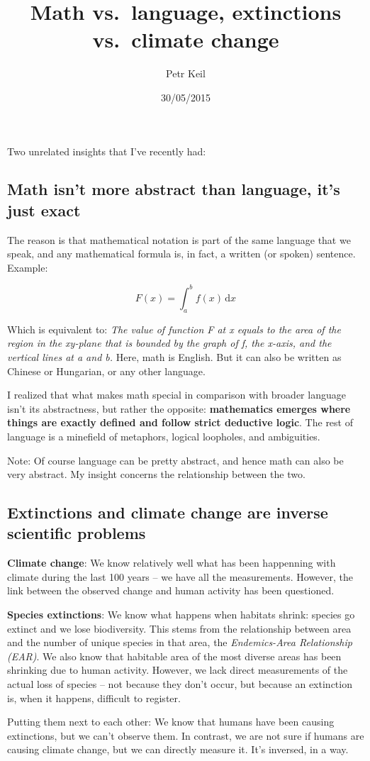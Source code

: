 \documentclass[]{article}
\title{Math vs.~language, extinctions vs.~climate change}
\author{Petr Keil}
\date{30/05/2015}
\begin{document}
\maketitle


Two unrelated insights that I've recently had:

\subsection{Math isn't more abstract than language, it's just
exact}\label{math-isnt-more-abstract-than-language-its-just-exact}

The reason is that mathematical notation is part of the same language
that we speak, and any mathematical formula is, in fact, a written (or
spoken) sentence. Example:

\[F(x)=\int_a^b \! f(x) \, \mathrm{d}x\]

Which is equivalent to: \emph{The value of function F at x equals to the
area of the region in the xy-plane that is bounded by the graph of f,
the x-axis, and the vertical lines at a and b.} Here, math is English.
But it can also be written as Chinese or Hungarian, or any other
language.

I realized that what makes math special in comparison with broader
language isn't its abstractness, but rather the opposite:
\textbf{mathematics emerges where things are exactly defined and follow
strict deductive logic}. The rest of language is a minefield of
metaphors, logical loopholes, and ambiguities.

Note: Of course language can be pretty abstract, and hence math can also
be very abstract. My insight concerns the relationship between the two.

\subsection{Extinctions and climate change are inverse scientific
problems}\label{extinctions-and-climate-change-are-inverse-scientific-problems}

\textbf{Climate change}: We know relatively well what has been
happenning with climate during the last 100 years -- we have all the
measurements. However, the link between the observed change and human
activity has been questioned.

\textbf{Species extinctions}: We know what happens when habitats shrink:
species go extinct and we lose biodiversity. This stems from the
relationship between area and the number of unique species in that area,
the \emph{Endemics-Area Relationship (EAR)}. We also know that habitable
area of the most diverse areas has been shrinking due to human activity.
However, we lack direct measurements of the actual loss of species --
not because they don't occur, but because an extinction is, when it
happens, difficult to register.

Putting them next to each other: We know that humans have been causing
extinctions, but we can't observe them. In contrast, we are not sure if
humans are causing climate change, but we can directly measure it. It's
inversed, in a way.
\end{document}
